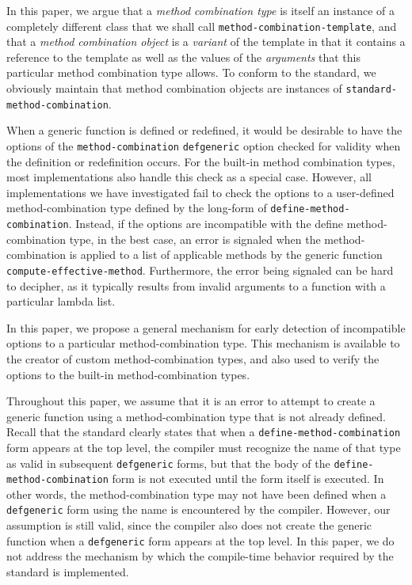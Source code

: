 In this paper, we argue that a \emph{method combination type} is
itself an instance of a completely different class that we shall call
\texttt{method-combination-template}, and that a \emph{method
  combination object} is a \emph{variant} of the template in that it
contains a reference to the template as well as the values of the
\emph{arguments} that this particular method combination type allows.
To conform to the standard, we obviously maintain that method
combination objects are instances of
\texttt{standard-method-combination}.

When a generic function is defined or redefined, it would be desirable
to have the options of the \texttt{method-combination}
\texttt{defgeneric} option checked for validity when the definition or
redefinition occurs.  For the built-in method combination types, most
implementations also handle this check as a special case.  However,
all implementations we have investigated fail to check the options to
a user-defined method-combination type defined by the long-form of
\texttt{define-method-combination}.  Instead, if the options are
incompatible with the define method-combination type, in the best
case, an error is signaled when the method-combination is applied to a
list of applicable methods by the generic function
\texttt{compute-effective-method}.  Furthermore, the error being
signaled can be hard to decipher, as it typically results from invalid
arguments to a function with a particular lambda list.

In this paper, we propose a general mechanism for early detection of
incompatible options to a particular method-combination type.  This
mechanism is available to the creator of custom method-combination
types, and also used to verify the options to the built-in
method-combination types.

Throughout this paper, we assume that it is an error to attempt to
create a generic function using a method-combination type that is not
already defined.  Recall that the standard clearly states that when a
\texttt{define-method-combination} form appears at the top level, the
compiler must recognize the name of that type as valid in subsequent
\texttt{defgeneric} forms, but that the body of the
\texttt{define-method-combination} form is not executed until the form
itself is executed.  In other words, the method-combination type may
not have been defined when a \texttt{defgeneric} form using the name
is encountered by the compiler.  However, our assumption is still
valid, since the compiler also does not create the generic function
when a \texttt{defgeneric} form appears at the top level.  In this
paper, we do not address the mechanism by which the compile-time
behavior required by the standard is implemented.
